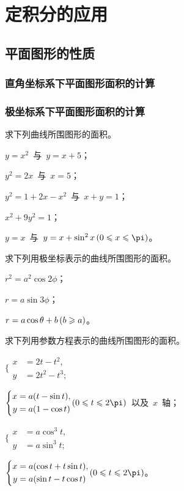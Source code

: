 

\chapter{定积分的应用}\label{ch:8}
\section{平面图形的性质}
\subsection{直角坐标系下平面图形面积的计算}
\subsection{极坐标系下平面图形面积的计算}
\begin{exercise}
\item 求下列曲线所围图形的面积。
\begin{exlistcols}
  \item $y=x^2$~与~$y=x+5$；
  \item $y^2=2x$~与~$x=5$；
  \item $y^2=1+2x-x^2$~与~$x+y=1$；
  \item $x^2+9y^2=1$；
  \item $y=x$~与~$y=x+\sin^2x\mcond{0\leq x\leq\pi}$。
\end{exlistcols}
\item 求下列用极坐标表示的曲线所围图形的面积。
\begin{exlistcols}[3]
  \item $r^2=a^2\cos2\phi$；
  \item $r=a\sin3\phi$；
  \item $r=a\cos\theta+b\mcond{b\geq a}$。
\end{exlistcols}
\item 求下列用参数方程表示的曲线所围图形的面积。
\begin{exlistcols}
  \item $\Biggl\lbrace\begin{aligned}
    x&=2t-t^2,\\ y&=2t^2-t^3;  \end{aligned}$
  \item $\Biggl\lbrace\begin{aligned}
    x&=a(t-\sin t),\\ y&=a(1-\cos t)\end{aligned}\mcond{0\leq t\leq 2\pi}$~以及~$x$~轴；
  \item $\Biggl\lbrace\begin{aligned}
    x&=a\cos^3t,\\ y&=a\sin^3t;\end{aligned}$
  \item $\Biggl\lbrace\begin{aligned}
    x&=a(\cos t+t\sin t), \\ y&=a(\sin t-t\cos t)\end{aligned}\mcond{0\leq t\leq 2\pi}$。
\end{exlistcols}
\end{exercise}

